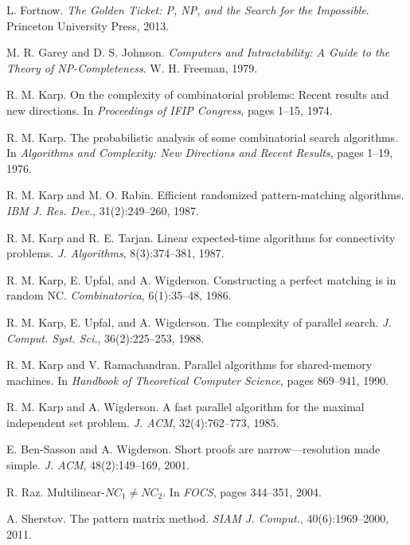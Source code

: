 \documentclass[11pt]{article}
\begin{document}
\begin{thebibliography}{99}
 L. Fortnow. \emph{The Golden Ticket: P, NP, and the Search for the Impossible}. Princeton University Press, 2013.

 M. R. Garey and D. S. Johnson. \emph{Computers and Intractability: A Guide to the Theory of NP-Completeness}. W. H. Freeman, 1979.

 R. M. Karp. On the complexity of combinatorial problems: Recent results and new directions. In \emph{Proceedings of IFIP Congress}, pages 1--15, 1974.

 R. M. Karp. The probabilistic analysis of some combinatorial search algorithms. In \emph{Algorithms and Complexity: New Directions and Recent Results}, pages 1--19, 1976.

 R. M. Karp and M. O. Rabin. Efficient randomized pattern-matching algorithms. \emph{IBM J. Res. Dev.}, 31(2):249--260, 1987.

 R. M. Karp and R. E. Tarjan. Linear expected-time algorithms for connectivity problems. \emph{J. Algorithms}, 8(3):374--381, 1987.

 R. M. Karp, E. Upfal, and A. Wigderson. Constructing a perfect matching is in random NC. \emph{Combinatorica}, 6(1):35--48, 1986.

 R. M. Karp, E. Upfal, and A. Wigderson. The complexity of parallel search. \emph{J. Comput. Syst. Sci.}, 36(2):225--253, 1988.

 R. M. Karp and V. Ramachandran. Parallel algorithms for shared-memory machines. In \emph{Handbook of Theoretical Computer Science}, pages 869--941, 1990.

 R. M. Karp and A. Wigderson. A fast parallel algorithm for the maximal independent set problem. \emph{J. ACM}, 32(4):762--773, 1985.

 E. Ben-Sasson and A. Wigderson. Short proofs are narrow—resolution made simple. \emph{J. ACM}, 48(2):149--169, 2001.

 R. Raz. Multilinear-$NC_1 \neq NC_2$. In \emph{FOCS}, pages 344--351, 2004.

 A. Sherstov. The pattern matrix method. \emph{SIAM J. Comput.}, 40(6):1969--2000, 2011.

\end{thebibliography}
\end{document}
